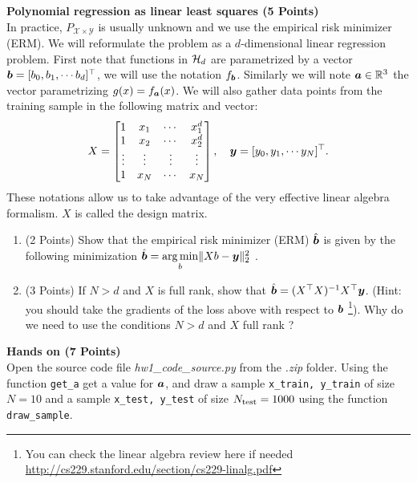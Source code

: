 \documentclass{article}
\newcommand{\bb}{b}
\begin{document}
\textbf{\color{nyupurple} Polynomial regression as linear least squares (5 Points)}\\
In practice, $P_{\mathcal{X} \times \mathcal{Y}}$ is usually unknown and we use the empirical risk minimizer (ERM). We will reformulate the problem as a $d$-dimensional linear regression problem. 
First note that functions in ${\mathcal{H}}_d$ are parametrized by a vector $\bs \bb = [\bb_0, \bb_1, \cdots \bb_d]^\top$, we will use the notation $f_{\bs \bb}$. Similarly we will note $\boldsymbol{a} \in {\mathbb{R}}^3$ the vector parametrizing $g(x) = f_{\boldsymbol{a}}(x)$. We will also gather data points from the training sample in the following matrix and vector:
\begin{align}
    X = \left[\begin{matrix}
    1 & x_1 & \cdots & x_1^d \\
    1 & x_2 & \cdots & x_2^d \\
    \vdots & \vdots & \vdots & \vdots \\
    1 & x_N & \cdots & x_N
\end{matrix} \right], \quad 
\boldsymbol{y} = [y_0, y_1, \cdots y_N]^\top.
\end{align}
These notations allow us to take advantage of the very effective linear algebra formalism. $X$ is called the design matrix.
\begin{enumerate}
\setcounter{enumi}{\value{saveenum}}
    \item (2 Points) Show that the empirical risk minimizer (ERM) $\hat{\bs \bb}$ is given by the following minimization $\hat{\bs \bb} = \underset{\bb}{\arg\min}\lVert X\bb - \bs y \Vert_2^2$ .
    
    \item (3 Points) If $N > d$ and $X$ is full rank, show that $\hat{\bs \bb} = (X^\top X)^{-1}X^\top \bs y$. (Hint: you should take the gradients of the loss above with respect to $\bs \bb$ \footnote{You can check the linear algebra review here if needed \url{http://cs229.stanford.edu/section/cs229-linalg.pdf}}). Why do we need to use the conditions $N > d$ and $X$ full rank ?  
    
\setcounter{saveenum}{\value{enumi}}  
\end{enumerate}

\textbf{\color{nyupurple} Hands on (7 Points)}\\
Open the source code file \emph{hw1\_code\_source.py} from the \emph{.zip} folder. Using the function \texttt{get\_a}  get a value for $\boldsymbol{a}$, and draw a sample \texttt{x\_train, y\_train} of size $N=10$ and a sample \texttt{x\_test, y\_test} of size $N_{\rm test}=1000$ using the function \texttt{draw\_sample}.
\end{document}
